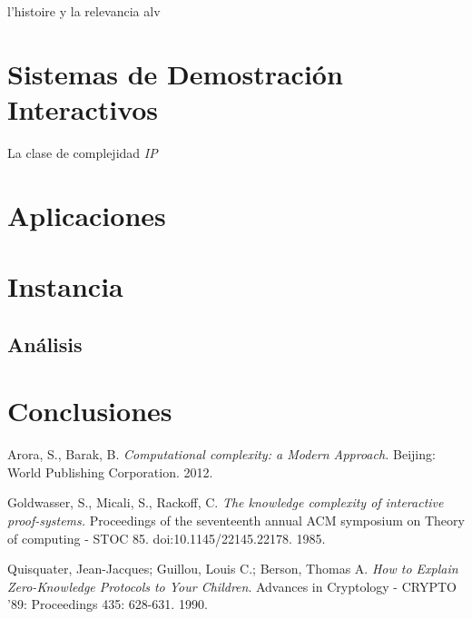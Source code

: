 \documentclass[oneside,10pt]{article}
\begin{document}
l'histoire y la relevancia alv


\section{Sistemas de Demostración Interactivos}
La clase de complejidad \emph{IP} \cite{arora}

\section{Aplicaciones}
\section{Instancia}
\subsection{Análisis}
\section{Conclusiones}

\begin{thebibliography}{99}

  Arora, S.,  Barak, B. 
  \emph{Computational complexity: a Modern Approach.}
  Beijing: World Publishing Corporation.
  2012.

  Goldwasser, S., Micali, S.,  Rackoff, C.
  \emph{The knowledge complexity of interactive proof-systems.}
  Proceedings of the seventeenth annual ACM symposium on Theory of computing - STOC 85.
  doi:10.1145/22145.22178.
  1985.

  Quisquater, Jean-Jacques; Guillou, Louis C.; Berson, Thomas A.
  \emph{How to Explain Zero-Knowledge Protocols to Your Children}.
  Advances in Cryptology - CRYPTO '89:
  Proceedings 435: 628-631.
  1990.
\end{thebibliography}
\end{document}
